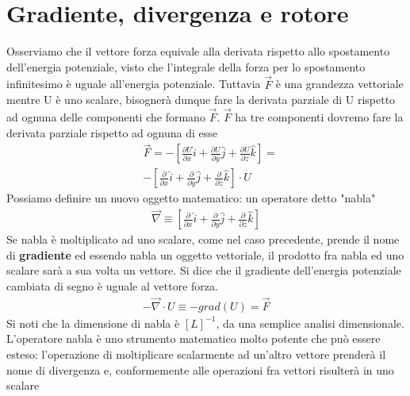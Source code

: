 \documentclass[10pt,a4paper]{article}
\begin{document}
\section{Gradiente, divergenza e rotore}
Osserviamo che il vettore forza equivale alla derivata rispetto allo spostamento dell'energia potenziale, visto che l'integrale della forza per lo spostamento infinitesimo è uguale all'energia potenziale. Tuttavia $\vec{F}$ è una grandezza vettoriale mentre U è uno scalare, bisognerà dunque fare la derivata parziale di U rispetto ad ognuna delle componenti che formano $\vec{F}$.  $\vec{F}$ ha tre componenti dovremo fare la derivata parziale rispetto ad ognuna di esse
\begin{align*}
	&\vec{F} = -[\frac{\partial U}{\partial x} \hat{i}+\frac{\partial U}{\partial y} \hat{j}+\frac{\partial U}{\partial z} \hat{k} ] =\\
	&-[\frac{\partial }{\partial x} \hat{i}+\frac{\partial }{\partial y} \hat{j}+\frac{\partial }{\partial z} \hat{k} ]\cdot U
\end{align*}
Possiamo definire un nuovo oggetto matematico: un operatore detto "nabla"
\begin{align*}
	\vec{\nabla} \equiv [\frac{\partial }{\partial x} \hat{i}+\frac{\partial }{\partial y} \hat{j}+\frac{\partial }{\partial z} \hat{k} ]
\end{align*}
Se nabla è moltiplicato ad uno scalare, come nel caso precedente, prende il nome di \textbf{gradiente} ed essendo nabla un oggetto vettoriale, il prodotto fra nabla ed uno scalare sarà a sua volta un vettore. Si dice che il gradiente dell'energia potenziale cambiata di segno è uguale al vettore forza.
\begin{align*}
	-\vec{\nabla} \cdot U \equiv -grad(U) = \vec{F}
\end{align*}
Si noti che la dimensione di nabla è $[L]^{-1}$, da una semplice analisi dimensionale. 
L'operatore nabla è uno strumento matematico molto potente che può essere esteso: l'operazione di moltiplicare scalarmente ad un'altro vettore prenderà il nome di divergenza e, conformemente alle operazioni fra vettori risulterà in uno scalare
\end{document}
